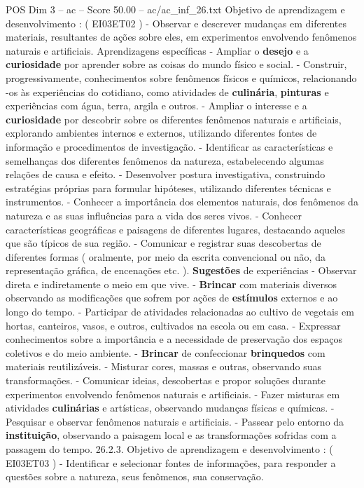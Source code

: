 \begin{textsample}{POS Dim 3 – ac – Score 50.00 – ac/ac\_inf\_26.txt}
Objetivo de aprendizagem e desenvolvimento : ( EI03ET02 ) - Observar e descrever mudanças em diferentes materiais, resultantes de ações sobre eles, em experimentos envolvendo fenômenos naturais e artificiais.
Aprendizagens específicas - Ampliar o \textbf{desejo} e a \textbf{curiosidade} por aprender sobre as coisas do mundo físico e social. - Construir, progressivamente, conhecimentos sobre fenômenos físicos e químicos, relacionando -os às experiências do cotidiano, como atividades de \textbf{culinária}, \textbf{pinturas} e experiências com água, terra, argila e outros. - Ampliar o interesse e a \textbf{curiosidade} por descobrir sobre os diferentes fenômenos naturais e artificiais, explorando ambientes internos e externos, utilizando diferentes fontes de informação e procedimentos de investigação. - Identificar as características e semelhanças dos diferentes fenômenos da natureza, estabelecendo algumas relações de causa e efeito. - Desenvolver postura investigativa, construindo estratégias próprias para formular hipóteses, utilizando diferentes técnicas e instrumentos. - Conhecer a importância dos elementos naturais, dos fenômenos da natureza e as suas influências para a vida dos seres vivos. - Conhecer características geográficas e paisagens de diferentes lugares, destacando aqueles que são típicos de sua região. - Comunicar e registrar suas descobertas de diferentes formas ( oralmente, por meio da escrita convencional ou não, da representação gráfica, de encenações etc. ). \textbf{Sugestões} de experiências - Observar direta e indiretamente o meio em que vive. - \textbf{Brincar} com materiais diversos observando as modificações que sofrem por ações de \textbf{estímulos} externos e ao longo do tempo. - Participar de atividades relacionadas ao cultivo de vegetais em hortas, canteiros, vasos, e outros, cultivados na escola ou em casa. - Expressar conhecimentos sobre a importância e a necessidade de preservação dos espaços coletivos e do meio ambiente. - \textbf{Brincar} de confeccionar \textbf{brinquedos} com materiais reutilizáveis. - Misturar cores, massas e outras, observando suas transformações. - Comunicar ideias, descobertas e propor soluções durante experimentos envolvendo fenômenos naturais e artificiais. - Fazer misturas em atividades \textbf{culinárias} e artísticas, observando mudanças físicas e químicas. - Pesquisar e observar fenômenos naturais e artificiais. - Passear pelo entorno da \textbf{instituição}, observando a paisagem local e as transformações sofridas com a passagem do tempo. 26.2.3.
Objetivo de aprendizagem e desenvolvimento : ( EI03ET03 ) - Identificar e selecionar fontes de informações, para responder a questões sobre a natureza, seus fenômenos, sua conservação.

\end{textsample}
